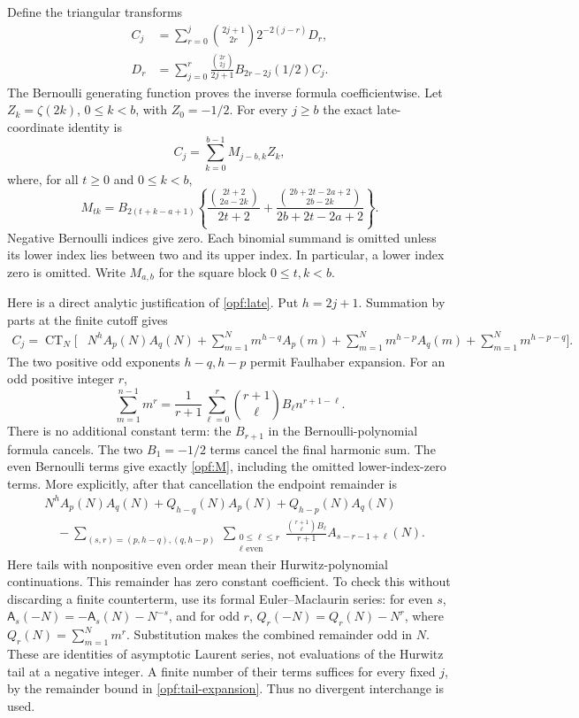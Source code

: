 Define the triangular transforms
\begin{align}
 C_j&=\sum_{r=0}^j\binom{2j+1}{2r}2^{-2(j-r)}D_r,
 \label{opf:C}\\
 D_r&=\sum_{j=0}^r\frac{\binom{2r}{2j}}{2j+1}
                                  B_{2r-2j}(1/2)C_j.
 \label{opf:D}
\end{align}
The Bernoulli generating function proves the inverse formula
coefficientwise. Let $Z_k=\zeta(2k)$, $0\le k<b$, with $Z_0=-1/2$.
For every $j\ge b$ the exact late-coordinate identity is
\begin{equation}\label{opf:late}
 C_j=\sum_{k=0}^{b-1}M_{j-b,k}Z_k,
\end{equation}
where, for all $t\ge0$ and $0\le k<b$,
\begin{equation}\label{opf:M}
 M_{tk}=B_{2(t+k-a+1)}
 \left\{\frac{\binom{2t+2}{2a-2k}}{2t+2}
 +\frac{\binom{2b+2t-2a+2}{2b-2k}}{2b+2t-2a+2}\right\}.
\end{equation}
Negative Bernoulli indices give zero. Each binomial summand is
omitted unless its lower index lies between two and its upper index.
In particular, a lower index zero is omitted. Write $M_{a,b}$ for
the square block $0\le t,k<b$.

Here is a direct analytic justification of \eqref{opf:late}. Put
$h=2j+1$. Summation by parts at the finite cutoff gives
\begin{align*}
 C_j=\operatorname{CT}_{N}\biggl[&N^h A_p(N)A_q(N)
 +\sum_{m=1}^N m^{h-q}A_p(m)
 +\sum_{m=1}^N m^{h-p}A_q(m)
 +\sum_{m=1}^N m^{h-p-q}\biggr].
\end{align*}
The two positive odd exponents $h-q,h-p$ permit Faulhaber expansion.
For an odd positive integer $r$,
\[
 \sum_{m=1}^{n-1}m^r=
 \frac1{r+1}\sum_{\ell=0}^{r}\binom{r+1}{\ell}B_\ell
                                                  n^{r+1-\ell}.
\]
There is no additional constant term: the $B_{r+1}$ in the
Bernoulli-polynomial formula cancels. The two $B_1=-1/2$ terms
cancel the final harmonic sum. The even Bernoulli terms give
exactly \eqref{opf:M}, including the omitted lower-index-zero terms.
More explicitly, after that cancellation the endpoint remainder is
\[
 \begin{aligned}
 &N^h A_p(N)A_q(N)+Q_{h-q}(N)A_p(N)+Q_{h-p}(N)A_q(N)\\
 &\quad-\sum_{(s,r)=(p,h-q),(q,h-p)}\ \sum_{\substack{0\le\ell\le r\\\ell\text{ even}}}
 \frac{\binom{r+1}{\ell}B_\ell}{r+1}A_{s-r-1+\ell}(N).
 \end{aligned}
\]
Here tails with nonpositive even order mean their Hurwitz-polynomial
continuations. This remainder has zero constant coefficient.
To check this without discarding a finite counterterm, use its
formal Euler--Maclaurin series: for even $s$,
$\mathsf A_s(-N)=-\mathsf A_s(N)-N^{-s}$, and for odd $r$,
$Q_r(-N)=Q_r(N)-N^r$, where $Q_r(N)=\sum_{m=1}^N m^r$.
Substitution makes the combined remainder odd in $N$. These are
identities of asymptotic Laurent series, not evaluations of the
Hurwitz tail at a negative integer. A finite number of their terms
suffices for every fixed $j$, by the remainder bound in
\eqref{opf:tail-expansion}. Thus no divergent interchange is used.

